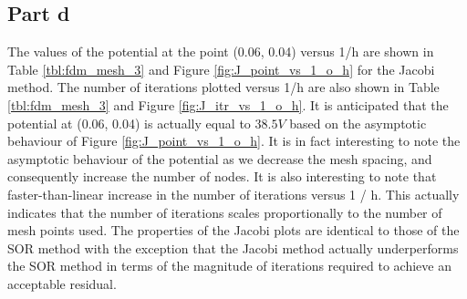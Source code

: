 \documentclass[11pt]{amsart}
\begin{document}
\subsection*{Part d}
The values of the potential at the point (0.06, 0.04) versus 1/h are shown in Table \ref{tbl:fdm_mesh_3} and Figure \ref{fig:J_point_vs_1_o_h} for the Jacobi method. The number of iterations plotted versus 1/h are also shown in Table \ref{tbl:fdm_mesh_3} and Figure \ref{fig:J_itr_vs_1_o_h}. It is anticipated that the potential at (0.06, 0.04) is actually equal to $38.5 V$ based on the asymptotic behaviour of Figure \ref{fig:J_point_vs_1_o_h}. It is in fact interesting to note the asymptotic behaviour of the potential as we decrease the mesh spacing, and consequently increase the number of nodes. It is also interesting to note that faster-than-linear increase in the number of iterations versus 1 / h. This actually indicates that the number of iterations scales proportionally to the number of mesh points used. The properties of the Jacobi plots are identical to those of the SOR method with the exception that the Jacobi method actually underperforms the SOR method in terms of the magnitude of iterations required to achieve an acceptable residual.
\end{document}
